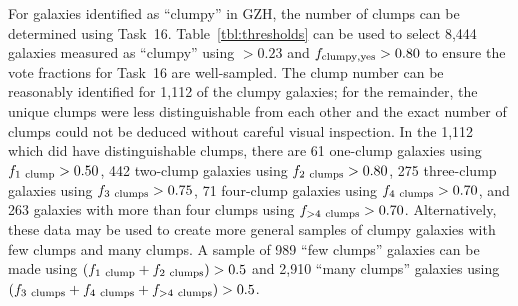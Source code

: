 \documentclass[twocolumn]{aastex6}
\begin{document}
For galaxies identified as ``clumpy'' in GZH, the number of clumps can be
determined using Task~16. Table~\ref{tbl:thresholds} can be used to select
8,444 galaxies measured as ``clumpy'' using \ffeatures$> 0.23$ and $f_{\rm
clumpy,yes}>0.80$ to ensure the vote fractions for Task~16 are well-sampled.
The clump number can be reasonably identified for 1,112 of the clumpy galaxies;
for the remainder, the unique clumps were less distinguishable from each other
and the exact number of clumps could not be deduced without careful visual
inspection. In the 1,112 which did have distinguishable clumps, there are
61 one-clump galaxies using $f_{\rm 1~clump}>0.50$, 442 two-clump galaxies
using $f_{\rm 2~clumps}>0.80$, 275 three-clump galaxies using $f_{\rm
3~clumps}>0.75$, 71 four-clump galaxies using $f_{\rm 4~clumps} > 0.70$,
and 263 galaxies with more than four clumps using $f_{\rm >4~clumps}>0.70$.
Alternatively, these data may be used to create more general samples of
clumpy galaxies with few clumps and many clumps. A sample of 989 ``few
clumps'' galaxies can be made using $(f_{\rm 1~clump} + f_{\rm 2~clumps}) >
0.5$ and 2,910 ``many clumps'' galaxies using $(f_{\rm 3~clumps}+f_{\rm
4~clumps}+f_{\rm >4~clumps})>0.5$.
\end{document}
